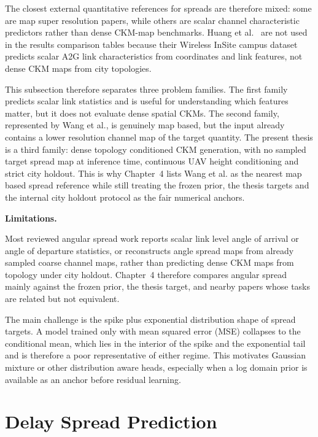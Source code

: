 The closest external quantitative references for spreads are therefore mixed:
some are map super resolution papers, while others are scalar channel
characteristic predictors rather than dense CKM-map benchmarks. Huang et al.\
\cite{huang2025a2gtransformer} are not used in the results comparison tables
because their Wireless InSite campus dataset predicts scalar A2G link
characteristics from coordinates and link features, not dense CKM maps from
city topologies.

This subsection therefore separates three problem families. The first family
predicts scalar link statistics and is useful for understanding which features
matter, but it does not evaluate dense spatial CKMs. The second family,
represented by Wang et al., is genuinely map based, but the input already
contains a lower resolution channel map of the target quantity. The present
thesis is a third family: dense topology conditioned CKM generation, with no
sampled target spread map at inference time, continuous UAV height conditioning
and strict city holdout. This is why Chapter~4 lists Wang et al. as the nearest
map based spread reference while still treating the frozen prior, the thesis
targets and the internal city holdout protocol as the fair numerical anchors.

\par\smallskip
\noindent\textbf{Limitations.}\par
\noindent Most reviewed angular spread work reports scalar link level angle of arrival or
angle of departure statistics, or reconstructs angle spread maps from already
sampled coarse channel maps, rather than predicting dense CKM maps from
topology under city holdout. Chapter~4 therefore compares angular spread mainly
against the frozen prior, the thesis target, and nearby papers whose tasks are
related but not equivalent.

The main challenge is the spike plus exponential distribution shape of spread
targets.  A model trained only with mean squared error (MSE) collapses to the
conditional mean, which lies in the interior of the spike and the exponential
tail and is therefore a poor representative of either regime. This motivates
Gaussian mixture or other distribution aware heads, especially when a
log domain prior is available as an anchor before residual learning.

\section{Delay Spread Prediction}
\label{sec:soa_delay_spread}

